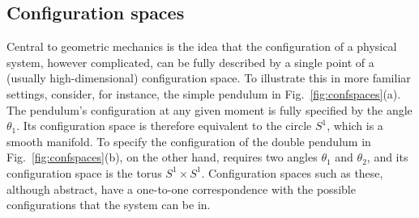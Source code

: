 \subsection{Configuration spaces}

Central to geometric mechanics is the idea that the configuration of a physical system, however complicated, can be fully described by a single point of a (usually high-dimensional) configuration space.
To illustrate this in more familiar settings, consider, for instance, the simple pendulum in Fig.~\ref{fig:confspaces}(a).
The pendulum's configuration at any given moment is fully specified by the angle $\theta_{1}$.
Its configuration space is therefore equivalent to the circle $S^{1}$, which is a smooth manifold.
To specify the configuration of the double pendulum in Fig.~\ref{fig:confspaces}(b), on the other hand, requires two angles $\theta_{1}$ and $\theta_{2}$, and its configuration space is the torus $S^{1}\times S^{1}$.
Configuration spaces such as these, although abstract, have a one-to-one correspondence with the possible configurations that the system can be in.

